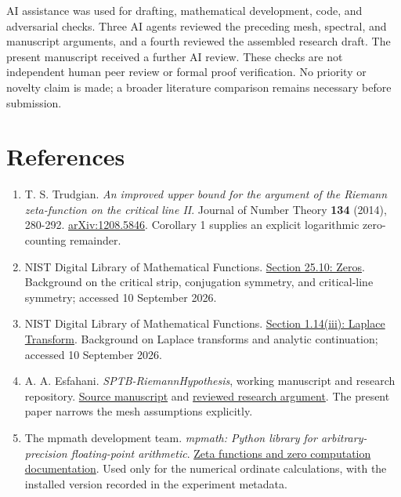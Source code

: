\documentclass[
  11pt,
]{article}
\begin{document}
AI assistance was used for drafting, mathematical development, code, and
adversarial checks. Three AI agents reviewed the preceding mesh,
spectral, and manuscript arguments, and a fourth reviewed the assembled
research draft. The present manuscript received a further AI review.
These checks are not independent human peer review or formal proof
verification. No priority or novelty claim is made; a broader literature
comparison remains necessary before submission.

\hypertarget{references}{%
\section{References}\label{references}}

\begin{enumerate}
\def\labelenumi{\arabic{enumi}.}
\item
  T. S. Trudgian. \emph{An improved upper bound for the argument of the
  Riemann zeta-function on the critical line II}. Journal of Number
  Theory \textbf{134} (2014), 280-292.
  \href{https://arxiv.org/abs/1208.5846}{arXiv:1208.5846}. Corollary 1
  supplies an explicit logarithmic zero-counting remainder.
\item
  NIST Digital Library of Mathematical Functions.
  \href{https://dlmf.nist.gov/25.10}{Section 25.10: Zeros}. Background
  on the critical strip, conjugation symmetry, and critical-line
  symmetry; accessed 10 September 2026.
\item
  NIST Digital Library of Mathematical Functions.
  \href{https://dlmf.nist.gov/1.14\#iii}{Section 1.14(iii): Laplace
  Transform}. Background on Laplace transforms and analytic
  continuation; accessed 10 September 2026.
\item
  A. A. Esfahani. \emph{SPTB-RiemannHypothesis}, working manuscript and
  research repository.
  \href{https://github.com/aakbarie/SPTB-RiemannHypothesis/tree/f8dbb8802cd6dc605e3f06d2286ba5c9a4ae42d7/paper_clean}{Source
  manuscript} and
  \href{https://github.com/aakbarie/SPTB-RiemannHypothesis/tree/b371c1c826a966f619851bacd9593bf26fa7a144/docs/research}{reviewed
  research argument}. The present paper narrows the mesh assumptions
  explicitly.
\item
  The mpmath development team. \emph{mpmath: Python library for
  arbitrary-precision floating-point arithmetic}.
  \href{https://mpmath.org/doc/current/functions/zeta.html}{Zeta
  functions and zero computation documentation}. Used only for the
  numerical ordinate calculations, with the installed version recorded
  in the experiment metadata.
\end{enumerate}
\end{document}
